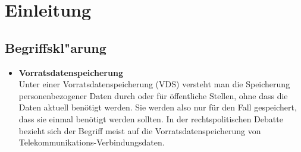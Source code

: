 
\section{Einleitung}
  \subsection{Begriffskl"arung}
    \begin{frame}
      \begin{itemize}
        \item \textbf{Vorratsdatenspeicherung}\\
          Unter einer Vorratsdatenspeicherung (VDS) versteht man die Speicherung personenbezogener Daten durch oder für öffentliche Stellen, ohne dass die Daten aktuell benötigt werden. Sie werden also nur für den Fall gespeichert, dass sie einmal benötigt werden sollten. In der rechtspolitischen Debatte bezieht sich der Begriff meist auf die Vorratsdatenspeicherung von Telekommunikations-Verbindungsdaten.
      \end{itemize}
    \end{frame}
